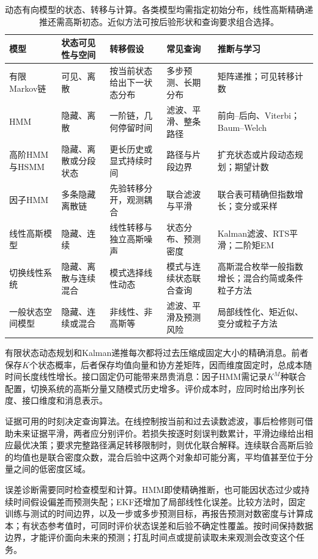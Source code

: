 \begin{table}[htbp]
  \centering
  \small
  \begin{tabularx}{\linewidth}{@{}p{25mm}p{23mm}p{29mm}p{27mm}X@{}}
    \toprule
    模型 & 状态可见性与空间 & 转移假设 & 常见查询 & 推断与学习 \\
    \midrule
    有限Markov链 & 可见、离散 & 按当前状态给出下一状态分布 & 多步预测、长期分布 & 矩阵递推；可见转移计数 \\
    HMM & 隐藏、离散 & 一阶链，几何停留时间 & 滤波、平滑、整条路径 & 前向--后向、Viterbi；Baum--Welch \\
    高阶HMM与HSMM & 隐藏、离散或分段状态 & 更长历史或显式持续时间 & 路径与片段边界 & 扩充状态或片段动态规划；期望计数 \\
    因子HMM & 多条隐藏离散链 & 先验转移分开，观测耦合 & 联合滤波与平滑 & 联合表可精确但指数增长；变分或采样 \\
    线性高斯模型 & 隐藏、连续 & 线性转移与独立高斯噪声 & 状态分布、预测密度 & Kalman滤波、RTS平滑；二阶矩EM \\
    切换线性系统 & 隐藏、离散与连续混合 & 模式选择线性动态 & 模式与连续状态联合查询 & 高斯混合枚举一般指数增长；混合约简或条件粒子方法 \\
    一般状态空间模型 & 隐藏、连续或混合 & 非线性、非高斯等 & 滤波、平滑及预测风险 & 局部线性化、矩近似、变分或粒子方法 \\
    \bottomrule
  \end{tabularx}
  \caption{动态有向模型的状态、转移与计算。各类模型均需指定初始分布，线性高斯精确递推还需高斯初态。近似方法可按后验形状和查询要求组合选择。}
  \label{tab:pgm-dynamic-models}
\end{table}

有限状态动态规划和Kalman递推每次都将过去压缩成固定大小的精确消息。前者保存$K$个状态概率，后者保存均值向量和协方差矩阵，因而维度固定时，总成本随时间长度线性增长。接口固定仍可能带来昂贵消息：因子HMM需记录$K^M$种联合配置，切换系统的高斯分量又随模式历史增多。评价成本时，应同时给出序列长度、接口维度和消息表示。

证据可用的时刻决定查询算法。在线控制按当前和过去读数滤波，事后检修则可借助未来证据平滑，两者应分别评价。若损失按逐时刻误判数累计，平滑边缘给出相应最优决策；要求完整路径满足转移限制时，则优化联合解释。连续联合高斯后验的均值也是联合密度众数，混合后验中这两个对象却可能分离，平均值甚至位于分量之间的低密度区域。

误差诊断需要同时检查模型和计算。HMM即使精确推断，也可能因状态过少或持续时间假设偏差而预测失配；EKF还增加了局部线性化误差。比较方法时，固定训练与测试的时间边界，以及一步或多步预测目标，再报告预测对数密度与计算成本；有状态参考值时，可同时评价状态误差和后验不确定性覆盖。按时间保持数据边界，才能评价面向未来的预测；打乱时间点或提前读取未来观测会改变这个任务。

